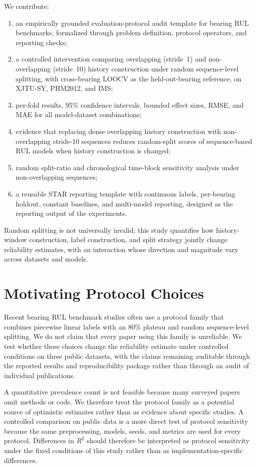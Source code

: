 \documentclass[pdflatex,sn-basic,NameDate]{sn-jnl}
\begin{document}
We contribute:
\begin{enumerate}
    \item an empirically grounded evaluation-protocol audit template for bearing RUL benchmarks, formalized through problem definition, protocol operators, and reporting checks;
    \item a controlled intervention comparing overlapping (stride~1) and non-overlapping (stride~10) history construction under random sequence-level splitting, with cross-bearing LOOCV as the held-out-bearing reference, on XJTU-SY, PHM2012, and IMS;
    \item per-fold results, 95\% confidence intervals, bounded effect sizes, RMSE, and MAE for all model-dataset combinations;
    \item evidence that replacing dense overlapping history construction with non-overlapping stride-10 sequences reduces random-split scores of sequence-based RUL models when history construction is changed;
    \item random split-ratio and chronological time-block sensitivity analysis under non-overlapping sequences;
    \item a reusable STAR reporting template with continuous labels, per-bearing holdout, constant baselines, and multi-model reporting, designed as the reporting output of the experiments.
\end{enumerate}
Random splitting is not universally invalid; this study quantifies how history-window construction, label construction, and split strategy jointly change reliability estimates, with an interaction whose direction and magnitude vary across datasets and models.


\section{Motivating Protocol Choices}
Recent bearing RUL benchmark studies often use a protocol family that combines piecewise linear labels with an 80\% plateau and random sequence-level splitting. We do not claim that every paper using this family is unreliable. We test whether these choices change the reliability estimate under controlled conditions on three public datasets, with the claims remaining auditable through the reported results and reproducibility package rather than through an audit of individual publications.

A quantitative prevalence count is not feasible because many surveyed papers omit methods or code. We therefore treat the protocol family as a potential source of optimistic estimates rather than as evidence about specific studies. A controlled comparison on public data is a more direct test of protocol sensitivity because the same preprocessing, models, seeds, and metrics are used for every protocol. Differences in $R^2$ should therefore be interpreted as protocol sensitivity under the fixed conditions of this study rather than as implementation-specific differences.
\end{document}
